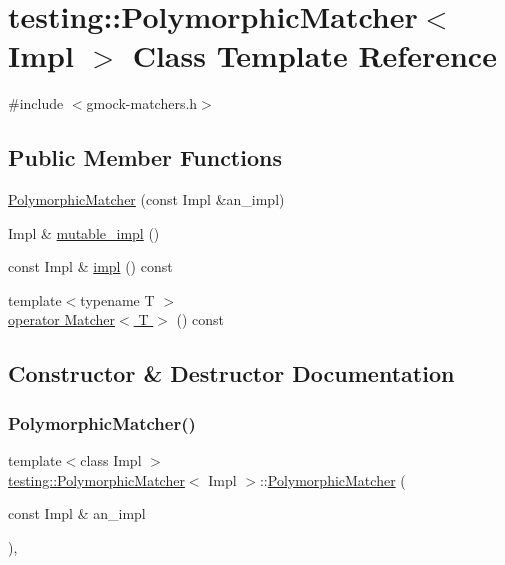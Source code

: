 \hypertarget{classtesting_1_1_polymorphic_matcher}{}\section{testing\+:\+:Polymorphic\+Matcher$<$ Impl $>$ Class Template Reference}
\label{classtesting_1_1_polymorphic_matcher}


{\ttfamily \#include $<$gmock-\/matchers.\+h$>$}

\subsection*{Public Member Functions}
\begin{DoxyCompactItemize}
\item 
\hyperlink{classtesting_1_1_polymorphic_matcher_a04c23972b2dcc6e036b00006d7689712}{Polymorphic\+Matcher} (const Impl \&an\+\_\+impl)
\item 
Impl \& \hyperlink{classtesting_1_1_polymorphic_matcher_a3b7227b1f5c203efd47d393b781b317c}{mutable\+\_\+impl} ()
\item 
const Impl \& \hyperlink{classtesting_1_1_polymorphic_matcher_ab10e4858d8dc903d3e1e378d53d25882}{impl} () const
\item 
{\footnotesize template$<$typename T $>$ }\\\hyperlink{classtesting_1_1_polymorphic_matcher_a6280c1485ca41a48c858c38828c1e04e}{operator Matcher$<$ T $>$} () const
\end{DoxyCompactItemize}


\subsection{Constructor \& Destructor Documentation}
\mbox{\label{classtesting_1_1_polymorphic_matcher_a04c23972b2dcc6e036b00006d7689712}} 
\subsubsection{\texorpdfstring{Polymorphic\+Matcher()}{PolymorphicMatcher()}}
{\footnotesize\ttfamily template$<$class Impl $>$ \\
\hyperlink{classtesting_1_1_polymorphic_matcher}{testing\+::\+Polymorphic\+Matcher}$<$ Impl $>$\+::\hyperlink{classtesting_1_1_polymorphic_matcher}{Polymorphic\+Matcher} (\begin{DoxyParamCaption}\item[{const Impl \&}]{an\+\_\+impl }\end{DoxyParamCaption})\hspace{0.3cm}{\ttfamily [inline]}, {\ttfamily [explicit]}}



